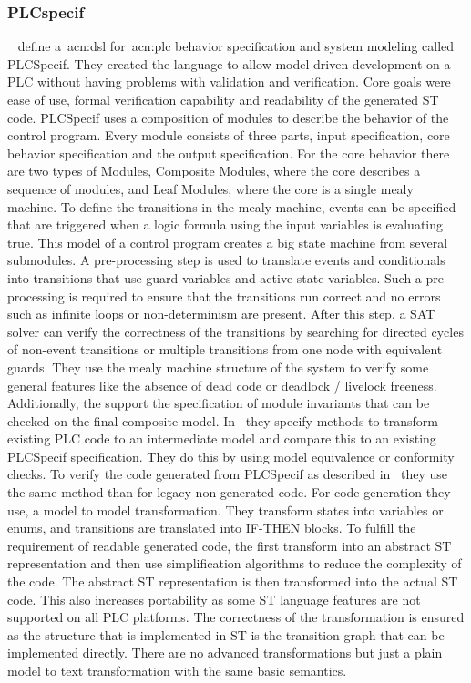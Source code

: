 \subsubsection{PLCspecif}
\label{sec:sub:plfspecif}

\citeauthor{7819191}~\cite{7819191, darvas2015syntax, darvas2015requirements, darvas2015formal, 10.1007/978-3-319-33693-0_32} define a~\acrshort{acn:dsl} for~\acrshort{acn:plc} behavior specification and system modeling called PLCSpecif.
They created the language to allow model driven development on a PLC without having problems with validation and verification.
Core goals were ease of use, formal verification capability and readability of the generated ST code.
PLCSpecif uses a composition of modules to describe the behavior of the control program.
Every module consists of three parts, input specification, core behavior specification and the output specification.
For the core behavior there are two types of Modules, Composite Modules, where the core describes a sequence of modules, and Leaf Modules, where the core is a single mealy machine.
To define the transitions in the mealy machine, events can be specified that are triggered when a logic formula using the input variables is evaluating true.
This model of a control program creates a big state machine from several submodules.
A pre-processing step is used to translate events and conditionals into transitions that use guard variables and active state variables.
Such a pre-processing is required to ensure that the transitions run correct and no errors such as infinite loops or non-determinism are present.
After this step, a SAT solver can verify the correctness of the  transitions by searching for directed cycles of non-event transitions or multiple transitions from one node with equivalent guards.
They use the mealy machine structure of the system to verify some general features like the absence of dead code or deadlock / livelock freeness.
Additionally, the support the specification of module invariants that can be checked on the final composite model.
In~\cite{10.1007/978-3-319-33693-0_32} they specify methods to transform existing PLC code to an intermediate model and compare this to an existing PLCSpecif specification.
They do this by using model equivalence or conformity checks.
To verify the code generated from PLCSpecif as described in~\cite{7819191} they use the same method than for legacy non generated code.
For code generation they use, a model to model transformation.
They transform states into variables or enums, and transitions are translated into IF-THEN blocks.
To fulfill the requirement of readable generated code, the first transform into an abstract ST representation and then use simplification algorithms to reduce the complexity of the code.
The abstract ST representation is then transformed into the actual ST code.
This also increases portability as some ST language features are not supported on all PLC platforms.
The correctness of the transformation is ensured as the structure that is implemented in ST is the transition graph that can be implemented directly.
There are no advanced transformations but just a plain model to text transformation with the same basic semantics.

